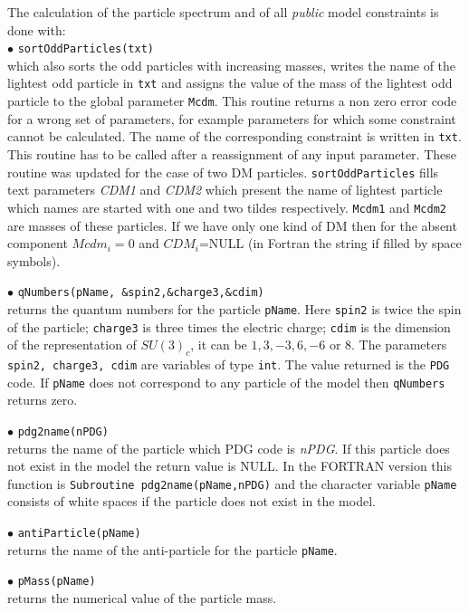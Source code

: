 \documentclass[12pt,a4paper]{article}
\begin{document}
The calculation of the particle spectrum and of all  {\it public} model constraints 
is  done with:\\
\noindent
 $\bullet$ \verb|sortOddParticles(txt)|\\
which also sorts the odd
particles with increasing  masses,  writes the name of the lightest odd particle 
in \verb|txt| and    assigns  the value of the mass  of
the lightest odd particle to the global parameter \verb|Mcdm|.
This routine returns a non zero error code for a
wrong set of parameters, for example parameters  for which some
constraint cannot be calculated.
The name of the corresponding constraint is
written in \verb|txt|. This routine has to be called after a reassignment of any input parameter.
These routine was updated for the case of two DM particles.  {\tt sortOddParticles} fills  text parameters  {\it CDM1} and {\it CDM2} 
which present the name of lightest  particle  which  names are started with one and two tildes respectively. {\tt Mcdm1} and {\tt Mcdm2} are masses of these
particles. If we have only one kind of DM  then  for the absent  component
$Mcdm_i=0$ and   $CDM_i$=NULL (in Fortran  the string  if filled by space symbols). 
 


\noindent 
$\bullet$ \verb|qNumbers(pName, &spin2,&charge3,&cdim)|\\
returns the quantum numbers for the particle \verb|pName|. Here \verb|spin2| is twice the spin of the particle; \verb|charge3| is 
three times the electric charge; \verb|cdim| is the  dimension of the representation
of $SU(3)_c$, it can be $1,3,-3,6,-6$ or $8$. The parameters {\tt spin2, charge3, cdim} are 
variables of type {\tt int}. The value returned 
is the {\tt PDG} code. If \verb|pName| does not correspond to any
particle of the model then \verb|qNumbers| returns zero.


\noindent
$\bullet$  \verb|pdg2name(nPDG)| \\
returns  the name of  the particle which PDG code is {\it nPDG}. If this particle does not exist in the model
the return value is NULL.  In the FORTRAN version this function
is \verb|Subroutine pdg2name(pName,nPDG)| and the character variable
\verb|pName| consists of white
spaces if the particle does not exist in the model. 

\noindent
$\bullet$  \verb|antiParticle(pName)| \\
returns  the name of the anti-particle for the particle \verb|pName|.

\noindent
$\bullet$  \verb|pMass(pName)| \\
returns  the numerical value of the particle mass.
\end{document}
